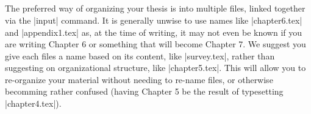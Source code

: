 \begin{lstlisting}



\end{lstlisting}

The preferred way of organizing your thesis is into multiple files, linked together via the |input| command. 
It is generally unwise to use names like |chapter6.tex| and |appendix1.tex| as, at the time of writing, it
may not even be known if you are writing Chapter 6 or something that will become Chapter 7.
We suggest you give each files a name based on its content, like |survey.tex|, rather than suggesting on organizational
structure, like |chapter5.tex|. This will allow you to re-organize your material without
needing to re-name files, or otherwise becomming rather confused (\eg having Chapter 5 be the result of typesetting |chapter4.tex|).
